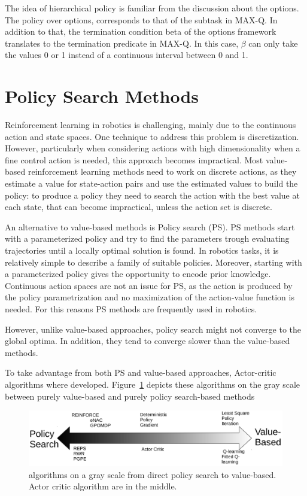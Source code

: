 The idea of hierarchical policy is familiar from the discussion about the options. The policy over options, corresponds to that of the subtask in MAX-Q. In addition to that, the termination condition beta of the options framework translates to the termination predicate in MAX-Q. In this case, $\beta$ can only take the values  0 or 1 instead of a continuous interval between 0 and 1.

\section{Policy Search Methods}
Reinforcement learning in robotics is challenging, mainly due to the continuous action and state spaces. One technique to address this problem is discretization. However, particularly when considering actions with high dimensionality when a fine control action is needed, this approach becomes impractical. Most value-based reinforcement learning methods need to work on discrete actions, as they  estimate a value for state-action pairs and use the estimated values to build the policy: to produce a policy they need to search the action with the best value at each state, that can become impractical, unless the action set is discrete. 

An alternative to value-based methods is Policy search (PS).
PS methods start with a parameterized policy and try to find the parameters trough evaluating trajectories until a locally optimal solution is found. In robotics tasks, it is relatively simple to describe a family of suitable policies. Moreover, starting with a parameterized policy gives the opportunity to encode prior knowledge. Continuous action spaces are not an issue for PS, as the action is produced by the policy parametrization and no maximization of the action-value function is needed. For this reasons PS methods are frequently used in robotics. 

However, unlike value-based approaches, policy search might not converge to the global optima. In addition, they tend to converge slower than the value-based methods.

To take advantage from both PS and value-based approaches, Actor-critic algorithms where developed. Figure~\ref{fig:pstovaluebased} depicts these algorithms on the gray scale between purely value-based and purely policy search-based methods

\begin{figure}[t]
	\centering 		
    \includegraphics[width=\textwidth]{./pictures/greyscale.pdf}
    \caption[policy search, actor critic and value-based]{algorithms on a gray scale from direct policy search to value-based. Actor critic algorithm are in the middle.}
    \label{fig:pstovaluebased} 
\end{figure}


